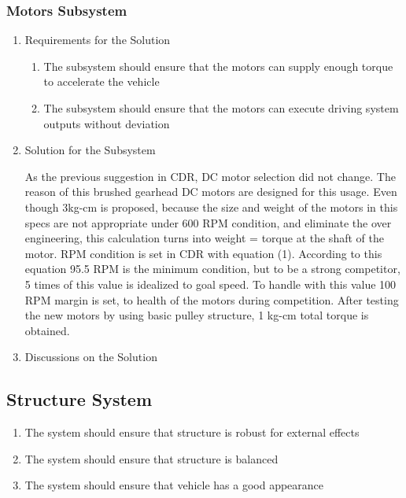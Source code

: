 \documentclass[a4paper,12pt]{article}
\begin{document}
\begin{enumerate}
	
		
	
	\subsubsection{Motors Subsystem}
	
		\begin{enumerate}
			\item {Requirements for the Solution}
			
			\begin{enumerate}
						\item The subsystem should ensure that the motors can supply enough torque to accelerate the vehicle 
		\item The subsystem should ensure that the motors can execute driving system outputs without deviation
					\end{enumerate} 
					
			\item {Solution for the Subsystem}
			
			As the previous suggestion in CDR, DC motor selection did not change. The reason of this brushed gearhead DC motors are designed for this usage. Even though 3kg-cm is proposed, because the size and weight of the motors in this specs are not appropriate under 600 RPM condition, and eliminate the over engineering, this calculation turns into weight = torque at the shaft of the motor. RPM condition is set in CDR with equation (1). According to this equation 95.5 RPM is the minimum condition, but to be a strong competitor, 5 times of this value is idealized to goal speed. To handle with this value 100 RPM margin is set, to health of the motors during competition.   
 After testing the new motors by using basic pulley structure, 1 kg-cm total torque is obtained.  

			
			\item {Discussions on the Solution}
			
		\end{enumerate}	
	
	
	
	
	\subsection{Structure System}
		
		\begin{enumerate}
			\item The system should	ensure that structure is robust for external effects 
			\item The system should	ensure that structure is balanced
			\item The system should ensure that vehicle has a good appearance
			

\end{enumerate}
\end{enumerate}
\end{document}
